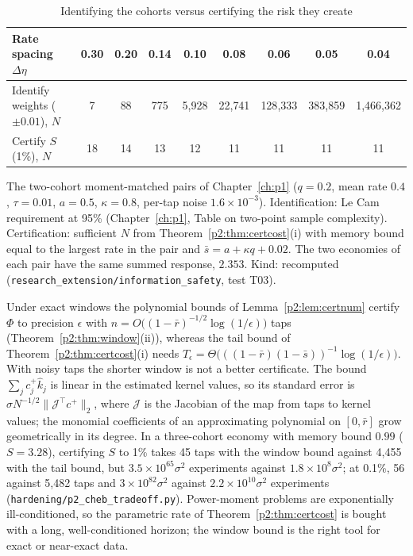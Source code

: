 \begin{table}[t]\centering\small
\begin{threeparttable}
\caption{Identifying the cohorts versus certifying the risk they create}\label{p2:tab:certvsid}
\begin{tabular}{lcccccccc}
\toprule
Rate spacing $\Delta\eta$ & 0.30 & 0.20 & 0.14 & 0.10 & 0.08 & 0.06 & 0.05 & 0.04\\
\midrule
Identify weights ($\pm0.01$), $N$ & 7 & 88 & 775 & 5{,}928 & 22{,}741 & 128{,}333 & 383{,}859 & 1{,}466{,}362\\
Certify $S$ (1\%), $N$ & 18 & 14 & 13 & 12 & 11 & 11 & 11 & 11\\
\bottomrule
\end{tabular}
\begin{tablenotes}\footnotesize\item The two-cohort moment-matched pairs of Chapter~\ref{ch:p1} ($q=0.2$, mean rate $0.4$, $\tau=0.01$, $a=0.5$, $\kappa=0.8$, per-tap noise $1.6\times10^{-3}$). Identification: Le Cam requirement at 95\% (Chapter~\ref{ch:p1}, Table on two-point sample complexity). Certification: sufficient $N$ from Theorem~\ref{p2:thm:certcost}(i) with memory bound equal to the largest rate in the pair and $\bar s=a+\kappa q+0.02$. The two economies of each pair have the same summed response, $2.353$. Kind: recomputed (\texttt{research\_extension/information\_safety}, test T03).\end{tablenotes}
\end{threeparttable}
\end{table}

\begin{remark}\label{p2:rem:cheb}
Under exact windows the polynomial bounds of Lemma~\ref{p2:lem:certnum} certify $\Phi$ to precision $\epsilon$ with $n=O\bigl((1-\bar r)^{-1/2}\log(1/\epsilon)\bigr)$ taps (Theorem~\ref{p2:thm:window}(ii)), whereas the tail bound of Theorem~\ref{p2:thm:certcost}(i) needs $T_\epsilon=\Theta\bigl(((1-\bar r)(1-\bar s))^{-1}\log(1/\epsilon)\bigr)$. With noisy taps the shorter window is not a better certificate. The bound $\sum_jc^+_j\hat k_j$ is linear in the estimated kernel values, so its standard error is $\sigma N^{-1/2}\|\mathcal J^\top c^+\|_2$, where $\mathcal J$ is the Jacobian of the map from taps to kernel values; the monomial coefficients of an approximating polynomial on $[0,\bar r]$ grow geometrically in its degree. In a three-cohort economy with memory bound $0.99$ ($S=3.28$), certifying $S$ to 1\% takes 45 taps with the window bound against 4{,}455 with the tail bound, but $3.5\times10^{65}\sigma^2$ experiments against $1.8\times10^{8}\sigma^2$; at 0.1\%, 56 against 5{,}482 taps and $3\times10^{82}\sigma^2$ against $2.2\times10^{10}\sigma^2$ experiments (\texttt{hardening/p2\_cheb\_tradeoff.py}). Power-moment problems are exponentially ill-conditioned, so the parametric rate of Theorem~\ref{p2:thm:certcost} is bought with a long, well-conditioned horizon; the window bound is the right tool for exact or near-exact data.
\end{remark}

